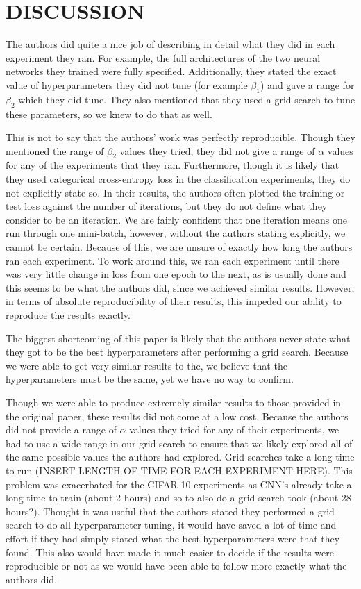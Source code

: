 \documentclass[letterpaper, 10 pt, conference]{ieeeconf}  %
\begin{document}
\section{DISCUSSION}
The authors did quite a nice job of describing in detail what they did in each experiment they ran. For example, the full architectures of the two neural networks they trained were fully specified. Additionally, they stated the exact value of hyperparameters they did not tune (for example $\beta_{1}$) and gave a range for $\beta_{2}$ which they did tune. They also mentioned that they used a grid search to tune these parameters, so we knew to do that as well. \par
This is not to say that the authors' work was perfectly reproducible. Though they mentioned the range of $\beta_{2}$ values they tried, they did not give a range of $\alpha$ values for any of the experiments that they ran. Furthermore, though it is likely that they used categorical cross-entropy loss in the classification experiments, they do not explicitly state so. In their results, the authors often plotted the training or test loss against the number of iterations, but they do not define what they consider to be an iteration. We are fairly confident that one iteration means one run through one mini-batch, however, without the authors stating explicitly, we cannot be certain. Because of this, we are unsure of exactly how long the authors ran each experiment. To work around this, we ran each experiment until there was very little change in loss from one epoch to the next, as is usually done and this seems to be what the authors did, since we achieved similar results. However, in terms of absolute reproducibility of their results, this impeded our ability to reproduce the results exactly. \par
The biggest shortcoming of this paper is likely that the authors never state what they got to be the best hyperparameters after performing a grid search. Because we were able to get very similar results to the, we believe that the hyperparameters must be the same, yet we have no way to confirm. \par
Though we were able to produce extremely similar results to those provided in the original paper, these results did not come at a low cost. Because the authors did not provide a range of $\alpha$ values they tried for any of their experiments, we had to use a  wide range in our grid search to ensure that we likely explored all of the same possible values the authors had explored. Grid searches take a long time to run (INSERT LENGTH OF TIME FOR EACH EXPERIMENT HERE). This problem was exacerbated for the CIFAR-10 experiments as CNN's already take a long time to train (about 2 hours) and so to also do a grid search took (about 28 hours?). Thought it was useful that the authors stated they performed a grid search to do all hyperparameter tuning, it would have saved a lot of time and effort if they had simply stated what the best hyperparameters were that they found. This also would have made it much easier to decide if the results were reproducible or not as we would have been able to follow more exactly what the authors did. \par
\end{document}
